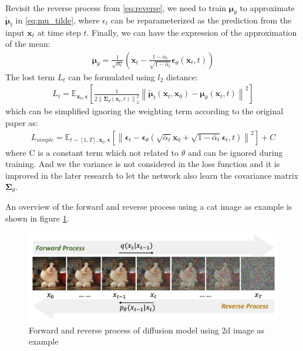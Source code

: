 \documentclass[12pt,DIV14,BCOR12mm,a4paper,footinclude=false,headinclude,parskip=half-,twoside,openright,cleardoublepage=empty,toc=index,bibliography=totoc,listof=totoc]{scrreprt}
\numberwithin{equation}{chapter}
\begin{document}
Revisit the reverse process from \ref{eq:reverse}, we need to train $\boldsymbol{\mu}_{\theta}$ to approximate $\boldsymbol{\tilde{\mu}}_{t}$ in \ref{eq:mu_tilde}, where $\epsilon_{t}$ can be reparameterized as the prediction from the input $\mathbf{x}_{t}$ at time step $t$. Finally, we can have the expression of the approximation of the mean:
\begin{align}
  \boldsymbol{\mu}_{\theta} = \frac{1}{\sqrt{\alpha_{t}}}\left(\mathbf{x}_{t} - \frac{1-\alpha_{t}}{\sqrt{1-\bar{\alpha}_{t}}}\boldsymbol{\epsilon}_{\theta}(\mathbf{x}_{t}, t)\right)
\end{align}
The lost term $L_{t}$ can be formulated using $l_{2}$ distance:
\begin{align}
  L_{t} = \mathbb{E}_{\mathbf{x}_{0},\boldsymbol{\epsilon}}\left[\frac{1}{2 \left\lVert \mathbf{\Sigma}_{\theta}(\mathbf{x}_{t},t)\right\rVert_{2}^{2}}\left\lVert\boldsymbol{\tilde{\mu}}_{t}(\mathbf{x}_{t},\mathbf{x}_{0}) - \boldsymbol{\mu}_{\theta}(\mathbf{x}_{t},t) \right\rVert ^{2}\right]
\end{align}
which can be simplified ignoring the weighting term according to the original paper\cite{ho2020denoising} as:
\begin{align}
  L_{simple} = \mathbb{E}_{t\sim[1,T],\mathbf{x}_{0},\boldsymbol{\epsilon}}\left[\left\lVert\boldsymbol{\epsilon}_{t} - \boldsymbol{\epsilon}_{\theta}(\sqrt{\bar{\alpha}_{t}}\mathbf{x}_{0} + \sqrt{1 - \bar{\alpha}_{t}}\boldsymbol{\epsilon}_{t}, t)\right\rVert ^{2}\right] + C
\end{align}
where C is a constant term which not related to $\theta$ and can be ignored during training.  And we the variance is not considered in the loss function and it is improved in the later research\cite{nichol2021improved} to let the network also learn the covariance matrix $\mathbf{\Sigma}_{\theta}$.

An overview of the forward and reverse process using a cat image as example is shown in figure \ref{img:diff_process}.
\begin{figure}[h]
	\centering
	\includegraphics[scale=.2]{img/diff_process.png}
	\caption{Forward and reverse process of diffusion model using \gls{2d} image as example}
	\label{img:diff_process}
\end{figure}
\end{document}
